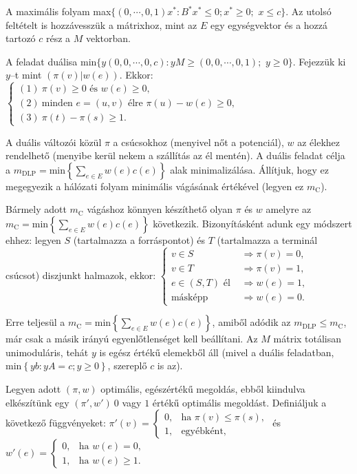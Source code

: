 A maximális folyam max$\{ (0, \cdots,0,1)x^* : B^*x^* \leq 0; x^* \geq 0;$ $x
\leq c \}$. Az utolsó feltételt is hozzávesszük a mátrixhoz, mint az $E$ egy
egységvektor és a hozzá tartozó $c$ rész a $M$ vektorban.

A feladat duálisa min$\{ y(0, 0, \cdots, 0, c) :yM \geq (0, 0, \cdots, 0, 1);$
$y \geq 0 \}$. Fejezzük ki $y$--t mint $\left( \pi\left(v\right) |
w\left(e\right)\right)$.
Ekkor: $\begin{cases} 
(1)~\pi(v) \geq 0 \mbox{ és } w(e) \geq 0, \\
(2)~\mbox{minden } e = (u,v) \mbox{ élre }  \pi(u)-w(e) \geq 0, \\
(3)~\pi(t)-\pi(s) \geq 1. \end{cases}$ 

A duális változói közül $\pi$ a csúcsokhoz (menyivel nőt a potenciál), $w$ az
élekhez rendelhető (menyibe kerül nekem a szállítás az él mentén). A duális
feladat célja a $m_{\text{DLP}}= \mbox{min} \left\{ \sum_{e\in E}^{}
w(e)c(e)\right\}$ alak minimalizálása. Állítjuk, hogy ez megegyezik a hálózati
folyam minimális vágásának értékével (legyen ez $m_{\text{C}}$).

Bármely adott $m_{\mbox{C}}$ vágáshoz könnyen készíthető olyan $\pi$ és $w$
amelyre az $m_{\text{C}}= \mbox{min} \left\{ \sum_{e\in E}^{} w(e)c(e)\right\}$
következik. Bizonyításként adunk egy módszert ehhez: legyen $S$ (tartalmazza a
forráspontot) és $T$ (tartalmazza a terminál csúcsot) diszjunkt halmazok, ekkor:
$\begin{cases}
v \in S &\Rightarrow \pi(v)=0, \\
v \in T &\Rightarrow \pi(v)=1, \\
e \in (S,T) \mbox{ él } &\Rightarrow w(e)=1, \\
\mbox{másképp} &\Rightarrow w(e)=0.
\end{cases}$

Erre teljesül a $m_{\text{C}}= \mbox{min} \left\{ \sum_{e\in E}^{}
w(e)c(e)\right\}$, amiből adódik az $m_{\mbox{DLP}} \leq m_{\mbox{C}}$, már csak
a másik irányú egyenlőtlenséget kell beállítani. Az $M$ mátrix totálisan
unimoduláris, tehát $y$ is egész értékű elemekből áll (mivel a duális
feladatban, min$\left\{ yb:yA=c; y\geq 0 \right\}$, szereplő $c$ is az).

Legyen adott $(\pi,w)$ optimális, egészértékű megoldás, ebből kiindulva
elkészítünk egy $(\pi',w')~0$ vagy $1$ értékű optimális megoldást. Definiáljuk a
következő függvényeket:
$\pi'(v)=
\begin{cases}
0, &\mbox{ha } \pi(v) \leq \pi(s), \\
1, &\mbox{egyébként}, 
\end{cases}$ és
$w'(e)=
\begin{cases}
0, &\mbox{ha } w(e)=0, \\
1, &\mbox{ha } w(e) \geq 1.
\end{cases}$ 

